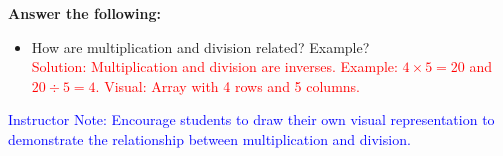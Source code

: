 \documentclass[12pt]{article}
\begin{document}
\begin{tcolorbox}[colframe=black!60, colback=white, 
coltitle=black, colbacktitle=black!15, fonttitle=\bfseries\Large, 
title=Exit Ticket, halign title=center, left=10pt, right=10pt, top=10pt, bottom=15pt]
\textbf{Answer the following:}
\begin{itemize}
    \item How are multiplication and division related? Example? \\\textcolor{red}{Solution: Multiplication and division are inverses. Example: $4 \times 5 = 20$ and $20 \div 5 = 4$. Visual: Array with 4 rows and 5 columns.}
\end{itemize}

\textcolor{blue}{Instructor Note: Encourage students to draw their own visual representation to demonstrate the relationship between multiplication and division.}
\vspace{5cm}
\end{tcolorbox}
\end{document}
